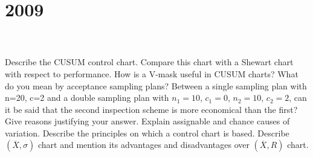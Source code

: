 \section*{2009}
\vspace{-.5cm}
\hrulefill \\\\
 Describe the CUSUM control chart. Compare this chart with a Shewart chart with respect to performance. How is a V-mask useful in CUSUM charts?
\myline
{} What do you mean by acceptance sampling plans? Between a single sampling plan with n=20, c=2 and a double sampling plan with $n_1 = 10$, $c_1 =0$, $n_2 = 10$, $c_2=2$, can it be said that the second inspection scheme is more economical than the first? Give reasons justifying your answer. 
\myline
{} Explain assignable and chance causes of variation. Describe the principles on which a control chart is based. Describe $(\overline{X},\sigma)$ chart and mention its advantages and disadvantages over $(\overline{X},R)$ chart.

